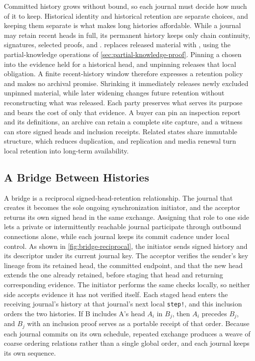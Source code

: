 Committed history grows without bound, so each journal must decide how much of it to keep. Historical identity and historical retention are separate choices, and keeping them separate is what makes long histories affordable. While a journal may retain recent heads in full, its permanent history keeps only chain continuity, signatures, selected proofs, and .  replaces released material with , using the partial-knowledge operations of \cref{sec:partial-knowledge-proof}. Pinning  a chosen  into the evidence held for a historical head, and unpinning releases that local obligation. A finite recent-history window therefore expresses a retention policy and makes no archival promise. Shrinking it immediately releases newly excluded unpinned material, while later widening changes future retention without reconstructing what was released. Each party preserves what serves its purpose and bears the cost of only that evidence. A buyer can pin an inspection report and its definitions, an archive can retain a complete site capture, and a witness can store signed heads and inclusion receipts. Related states share immutable structure, which reduces duplication, and replication and media renewal turn local retention into long-term availability.

\subsection{A Bridge Between Histories}
\label{sec:bridge-histories}

A bridge is a reciprocal signed-head-retention relationship. The journal that creates it becomes the sole ongoing synchronization initiator, and the acceptor returns its own signed head in the same exchange. Assigning that role to one side lets a private or intermittently reachable journal participate through outbound connections alone, while each journal keeps its commit cadence under local control. As shown in \cref{fig:bridge-reciprocal}, the initiator sends signed history and its descriptor under its current journal key. The acceptor verifies the sender's key lineage from its retained head, the committed endpoint, and that the new head extends the one already retained, before staging that head and returning corresponding evidence. The initiator performs the same checks locally, so neither side accepts evidence it has not verified itself. Each staged head enters the receiving journal's history at that journal's next local \texttt{step!}, and this inclusion orders the two histories. If B includes A's head $A_i$ in $B_j$, then $A_i$ precedes $B_j$, and $B_j$ with an inclusion proof serves as a portable receipt of that order. Because each journal commits on its own schedule, repeated exchange produces a weave of coarse ordering relations rather than a single global order, and each journal keeps its own sequence.

